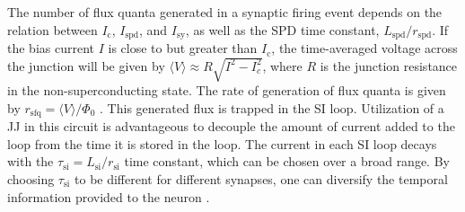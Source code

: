 \documentclass[twocolumn]{article}
\begin{document}
The number of flux quanta generated in a synaptic firing event depends on the relation between $I_{\mathrm{c}}$, $I_{\mathrm{spd}}$, and $I_{\mathrm{sy}}$, as well as the SPD time constant, $L_{\mathrm{spd}}/r_{\mathrm{spd}}$. If the bias current $I$ is close to but greater than $I_{\mathrm{c}}$, the time-averaged voltage across the junction will be given by $\langle V \rangle \approx R \sqrt{I^2-I_c^2}$, where $R$ is the junction resistance in the non-superconducting state. The rate of generation of flux quanta is given by $r_{\mathrm{sfq}} = \langle V \rangle/\Phi_0$ \cite{ka1999}. This generated flux is trapped in the SI loop. Utilization of a JJ in this circuit is advantageous to decouple the amount of current added to the loop from the time it is stored in the loop. The current in each SI loop decays with the $\tau_{\mathrm{si}} = L_{\mathrm{si}}/r_{\mathrm{si}}$ time constant, which can be chosen over a broad range. By choosing $\tau_{\mathrm{si}}$ to be different for different synapses, one can diversify the temporal information provided to the neuron \cite{stsa2000,abre2004,budr2004,be2007}.
\end{document}
